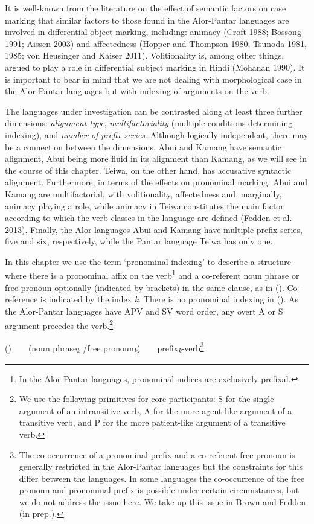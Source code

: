 It is well-known from the literature on the effect of semantic factors on case marking that similar factors to those found in the Alor-Pantar languages are involved in differential object marking, including: animacy (Croft 1988; Bossong 1991; Aissen 2003) and affectedness (Hopper and Thompson 1980; Tsunoda 1981, 1985; von Heusinger and Kaiser 2011). Volitionality is, among other things, argued to play a role in differential subject marking in Hindi (Mohanan 1990). It is important to bear in mind that we are not dealing with morphological case in the Alor-Pantar languages but with indexing of arguments on the verb.

The languages under investigation can be contrasted along at least three further dimensions: \textit{alignment type}, \textit{multifactoriality} (multiple conditions determining indexing), and \textit{number of prefix series}. Although logically independent, there may be a connection between the dimensions. Abui and Kamang have semantic alignment, Abui being more fluid in its alignment than Kamang, as we will see in the course of this chapter. Teiwa, on the other hand, has accusative syntactic alignment. Furthermore, in terms of the effects on pronominal marking, Abui and Kamang are multifactorial, with volitionality, affectedness and, marginally, animacy playing a role, while animacy in Teiwa constitutes the main factor according to which the verb classes in the language are defined (Fedden et al. 2013). Finally, the Alor languages Abui and Kamang have multiple prefix series, five and six, respectively, while the Pantar language Teiwa has only one.

In this chapter we use the term {\textquoteleft}pronominal indexing{\textquoteright} to describe a structure where there is a pronominal affix on the verb\footnote{In the Alor-Pantar languages, pronominal indices are exclusively prefixal.} and a co-referent noun phrase or free pronoun optionally (indicated by brackets) in the same clause, as in (). Co-reference is indicated by the index \textit{k}. There is no pronominal indexing in (). As the Alor-Pantar languages have APV and SV word order, any overt A or S argument precedes the verb.\footnote{We use the following primitives for core participants: S for the single argument of an intransitive verb, A for the more agent-like argument of a transitive verb, and P for the more patient-like argument of a transitive verb.}

\label{bkm:Ref306281876}()\ \ \ \ (noun phrase\textit{\textsubscript{k }}/free pronoun\textit{\textsubscript{k}})\ \ \ \ prefix\textit{\textsubscript{k}}{}-verb\footnote{The co-occurrence of a pronominal prefix and a co-referent free pronoun is generally restricted in the Alor-Pantar languages but the constraints for this differ between the languages. In some languages the co-occurrence of the free pronoun and pronominal prefix is possible under certain circumstances, but we do not address the issue here. We take up this issue in Brown and Fedden (in prep.).}

